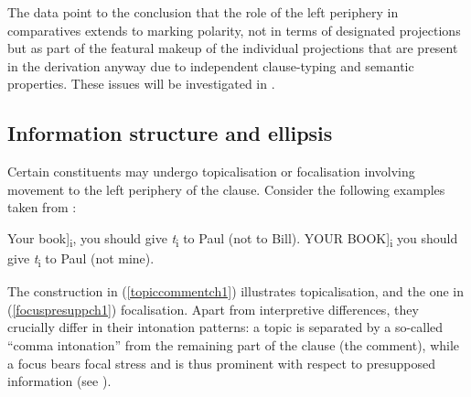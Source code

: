 The data point to the conclusion that the role of the left periphery in comparatives extends to marking polarity, not in terms of designated projections but as part of the featural makeup of the individual projections that are present in the derivation anyway due to independent clause-typing and semantic properties. These issues will be investigated in .

\subsection{Information structure and ellipsis} \label{sec:1information}
Certain constituents may undergo topicalisation or focalisation involving movement to the left periphery of the clause. Consider the following examples taken from \citet[285, ex. 1 and 2]{rizzi1997}:

\ea \label{englishrizzich1}
\ea {[}Your book]\textsubscript{i}, you should give \textit{t}\textsubscript{i} to Paul (not to Bill). \label{topiccommentch1}
\ex {[}YOUR BOOK]\textsubscript{i} you should give \textit{t}\textsubscript{i} to Paul (not mine). \label{focuspresuppch1}
\z
\z

The construction in (\ref{topiccommentch1}) illustrates topicalisation, and the one in (\ref{focuspresuppch1}) focalisation. Apart from interpretive differences, they crucially differ in their intonation patterns: a topic is separated by a so-called ``comma intonation'' from the remaining part of the clause (the comment), while a focus bears focal stress and is thus prominent with respect to presupposed information (see \citealt[258]{rizzi1997}).

